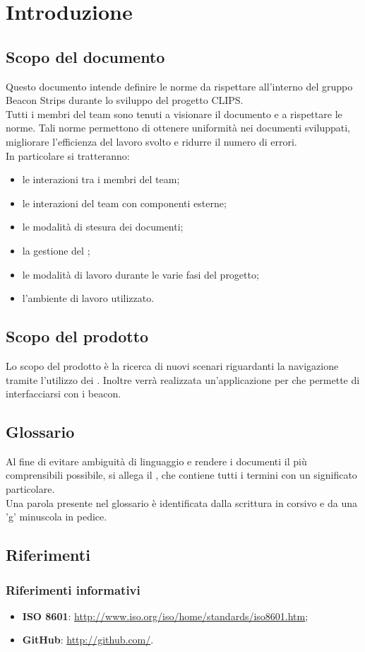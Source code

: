 \section{Introduzione}
	\subsection{Scopo del documento}
	Questo documento intende definire le norme da rispettare all'interno del gruppo Beacon Strips durante lo sviluppo del progetto CLIPS. \\
	Tutti i membri del team sono tenuti a visionare il documento e a rispettare le norme. Tali norme permettono di ottenere uniformità nei documenti sviluppati,
	migliorare l'efficienza del lavoro svolto e ridurre il numero di errori. \\
	In particolare si tratteranno:
	\begin{itemize}
		\item le interazioni tra i membri del team;
		\item le interazioni del team con componenti esterne;
		\item le modalità di stesura dei documenti;
		\item la gestione del ;
		\item le modalità di lavoro durante le varie fasi del progetto;
		\item l'ambiente di lavoro utilizzato.
	\end{itemize}
	
	\subsection{Scopo del prodotto}
	Lo scopo del prodotto è la ricerca di nuovi scenari riguardanti la navigazione tramite l'utilizzo dei . Inoltre verrà realizzata un'applicazione per  che permette di interfacciarsi con i beacon.
	\subsection{Glossario}
	Al fine di evitare ambiguità di linguaggio e rendere i documenti il più comprensibili possibile, si allega il \Gldoc, che contiene tutti i termini con un significato particolare. \\
	Una parola presente nel glossario è identificata dalla scrittura in corsivo e da una 'g' minuscola in pedice. %
	\subsection{Riferimenti}
		\subsubsection{Riferimenti informativi}
		\begin{itemize}
			\item \textbf{ISO 8601}: \url{http://www.iso.org/iso/home/standards/iso8601.htm};
			\item \textbf{GitHub}: \url{http://github.com/}.
		\end{itemize}
	
